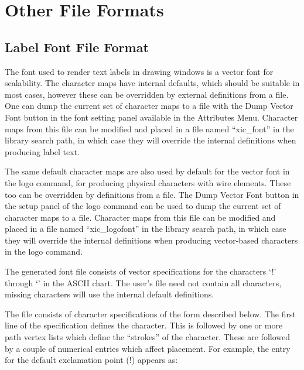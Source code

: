 
\chapter{Other File Formats}

\section{Label Font File Format}
\label{vectorfont}

The font used to render text labels in drawing windows is a vector
font for scalability.  The character maps have internal defaults,
which should be suitable in most cases, however these can be
overridden by external definitions from a file.  One can dump the
current set of character maps to a file with the {\cb Dump Vector
Font} button in the font setting panel available in the {\cb
Attributes Menu}.  Character maps from this file can be modified and
placed in a file named ``{\vt xic\_font}'' in the library search path,
in which case they will override the internal definitions when
producing label text.

The same default character maps are also used by default for the
vector font in the {\cb logo} command, for producing physical
characters with wire elements.  These too can be overridden by
definitions from a file.  The {\cb Dump Vector Font} button in the
setup panel of the {\cb logo} command can be used to dump the current
set of character maps to a file.  Character maps from this file can be
modified and placed in a file named ``{\vt xic\_logofont}'' in the
library search path, in which case they will override the internal
definitions when producing vector-based characters in the {\cb logo}
command.

The generated font file consists of vector specifications for the
characters `{\vt !}' through `{\vt {}}' in the ASCII chart. 
The user's file need not contain all characters, missing characters
will use the internal default definitions.

The file consists of character specifications of the form described
below.  The first line of the specification defines the character. 
This is followed by one or more path vertex lists which define the
``strokes'' of the character.  These are followed by a couple of
numerical entries which affect placement.  For example, the entry for
the default exclamation point (!) appears as:

